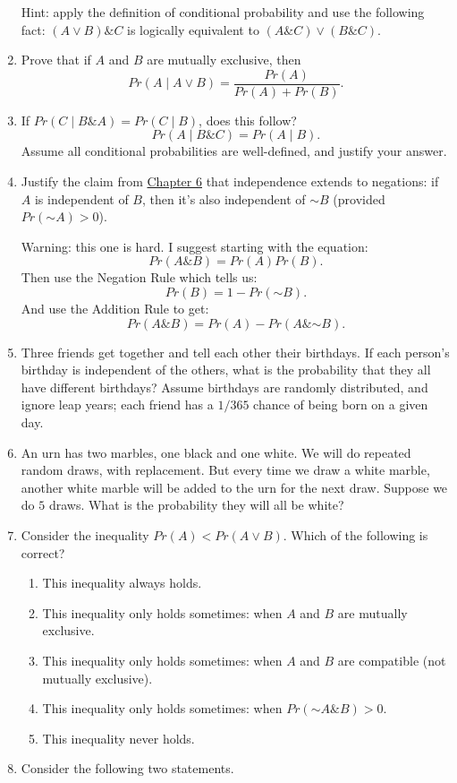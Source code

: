 \documentclass[justified]{tufte-book}
\providecommand{\tightlist}{%
  \setlength{\itemsep}{0pt}\setlength{\parskip}{0pt}}
\newcommand{\given}{\mid}
\renewcommand{\neg}{\mathbin{\sim}}
\renewcommand{\wedge}{\mathbin{\&}}
\newcommand{\p}{Pr}
\theoremstyle{definition}
\theoremstyle{definition}
\theoremstyle{definition}
\theoremstyle{definition}
\theoremstyle{remark}
\begin{document}
\begin{enumerate}
  Hint: apply the definition of conditional probability and use the following fact: \((A \vee B) \wedge C\) is logically equivalent to \((A \wedge C) \vee (B \wedge C)\).
\item
  Prove that if \(A\) and \(B\) are mutually exclusive, then
  \[\p(A \given A \vee B) = \frac{ \p(A) }{ \p(A) + \p(B) }.\]
\item
  If \(\p(C \given B \wedge A) = \p(C \given B)\), does this follow?
  \[\p(A \given B \wedge C) = Pr(A \given B).\]
  Assume all conditional probabilities are well-defined, and justify your answer.
\item
  Justify the claim from \protect\hyperlink{declaring-independence}{Chapter 6} that independence extends to negations: if \(A\) is independent of \(B\), then it's also independent of \(\neg B\) (provided \(\p(\neg A) > 0\)).

  Warning: this one is hard. I suggest starting with the equation:
  \[ \p(A \wedge B) = \p(A) \p(B). \]
  Then use the Negation Rule which tells us:
  \[ \p(B) = 1 - \p(\neg B). \]
  And use the Addition Rule to get:
  \[ \p(A \wedge B) = \p(A) - \p(A \wedge \neg B).\]
\item
  Three friends get together and tell each other their birthdays. If each person's birthday is independent of the others, what is the probability that they all have different birthdays? Assume birthdays are randomly distributed, and ignore leap years; each friend has a \(1/365\) chance of being born on a given day.
\item
  An urn has two marbles, one black and one white. We will do repeated random draws, with replacement. But every time we draw a white marble, another white marble will be added to the urn for the next draw. Suppose we do \(5\) draws. What is the probability they will all be white?
\item
  Consider the inequality \(\p(A) < \p(A \vee B)\). Which of the following is correct?

  \begin{enumerate}
  \def\labelenumii{\alph{enumii}.}
  \tightlist
  \item
    This inequality always holds.
  \item
    This inequality only holds sometimes: when \(A\) and \(B\) are mutually exclusive.
  \item
    This inequality only holds sometimes: when \(A\) and \(B\) are compatible (not mutually exclusive).
  \item
    This inequality only holds sometimes: when \(\p(\neg A \wedge B) > 0\).
  \item
    This inequality never holds.
  \end{enumerate}
\item
  Consider the following two statements.


\end{enumerate}
\end{document}

